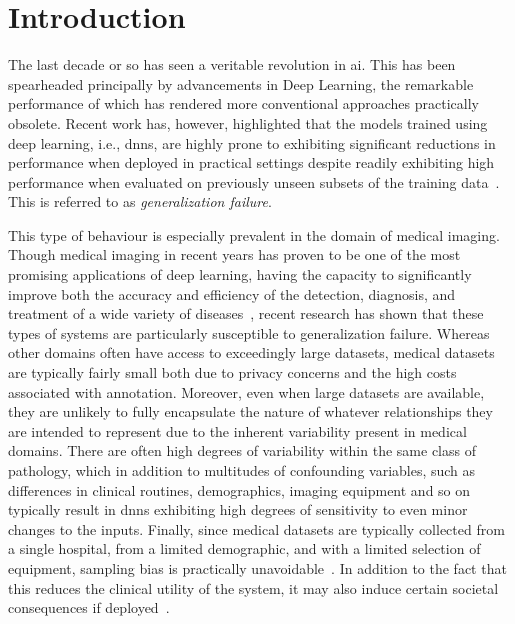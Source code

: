     \chapter{Introduction}\label{introduction}

    The last decade or so has seen a veritable revolution in \gls{ai}. This has been spearheaded principally by advancements in Deep Learning, the remarkable performance of which has rendered more conventional approaches practically obsolete. Recent work has, however, highlighted that the models trained using deep learning, i.e., \glspl{dnn}, are highly prone to exhibiting significant reductions in performance when deployed in practical settings despite readily exhibiting high performance when evaluated on previously unseen subsets of the training data~\cite{damour2020underspecification, shortcut_learning, noise_robustness, corruption_robustness}. This is referred to as \textit{generalization failure}. 
    

    This type of behaviour is especially prevalent in the domain of medical imaging. Though medical imaging in recent years has proven to be one of the most promising applications of deep learning, having the capacity to significantly improve both the accuracy and efficiency of the detection, diagnosis, and treatment of a wide variety of diseases~\cite{dl_medical_imaging}, recent research has shown that these types of systems are particularly susceptible to generalization failure. Whereas other domains often have access to exceedingly large datasets, medical datasets are typically fairly small both due to privacy concerns and the high costs associated with annotation. Moreover, even when large datasets are available, they are unlikely to fully encapsulate the nature of whatever relationships they are intended to represent due to the inherent variability present in medical domains. There are often high degrees of variability within the same class of pathology, which in addition to multitudes of confounding variables, such as differences in clinical routines, demographics, imaging equipment and so on typically result in \glspl{dnn} exhibiting high degrees of sensitivity to even minor changes to the inputs. Finally, since medical datasets are typically collected from a single hospital, from a limited demographic, and with a limited selection of equipment, sampling bias is practically unavoidable~\cite{bias, bias2}. In addition to the fact that this reduces the clinical utility of the system, it may also induce certain societal consequences if deployed~\cite{social_consequence_1}. 
    

